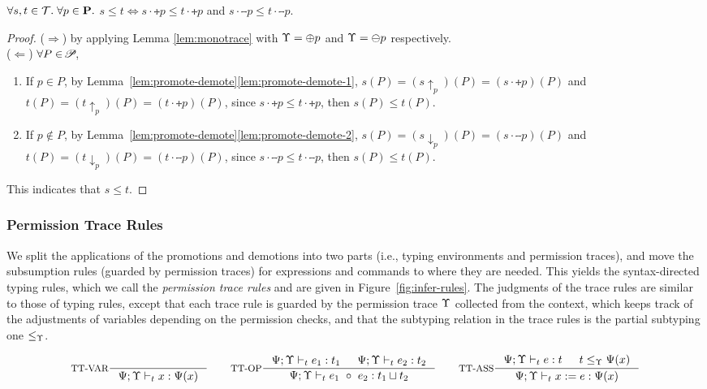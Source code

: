 {{{\begin{lemma}\label{lem:tracesub}
$\forall s,t\in\mathcal{T}.\; \forall p\in\mathbf{P}.$ $s\leq t\Leftrightarrow  s\cdot\tplus{ p}\leq t\cdot\tplus{ p}$ and $s\cdot\tminus{ p}\leq t\cdot\tminus{ p}$.
\end{lemma}
\begin{proof}
($\Rightarrow$) by applying Lemma \ref{lem:monotrace} with $\Upsilon=\oplus  p$ and $\Upsilon=\ominus p$ respectively.\\
($\Leftarrow$) $\forall P\in\!\mathscr{P}\!$,
\begin{enumerate}[label=(\arabic*)]
	\item If $p\in P$, by Lemma~\ref{lem:promote-demote}\ref{lem:promote-demote-1}, $s(P)=(s\uparrow_{p})(P)=(s\cdot\tplus{ p})(P)$ and $t(P)=(t\uparrow_{p})(P)=(t\cdot\tplus{ p})(P)$, since $s\cdot\tplus{ p}\leq t\cdot\tplus{ p}$, then $s(P)\leq t(P)$.
	\item If $p\not\in P$, by Lemma~\ref{lem:promote-demote}\ref{lem:promote-demote-2}, $s(P)=(s\downarrow_{p})(P)=(s\cdot\tminus{ p})(P)$ and $t(P)=(t\downarrow_{p})(P)=(t\cdot\tminus{ p})(P)$, since $s\cdot\tminus{ p}\leq t\cdot\tminus{p}$, then $s(P)\leq t(P)$.
\end{enumerate}
This indicates that $s\leq t$.
\end{proof}


\subsubsection{\textbf{Permission Trace Rules}}
 We split the applications of the promotions and demotions into two parts  (i.e., typing environments and permission traces), and move the subsumption rules (guarded by permission traces) for expressions and commands to where they are needed.
This yields the syntax-directed  typing rules, which we call the {\em permission trace rules} and are given in Figure~\ref{fig:infer-rules}.
The judgments of the trace rules are similar to those of typing rules, except that each trace rule is guarded by the permission trace $\Upsilon$ collected from the context, which keeps track of the adjustments of variables depending on the permission checks,
and that the subtyping relation in the trace rules is the partial subtyping one $\leq_{\Upsilon}$.

\begin{figure*}[ht]
\begin{tiny}
\[
\inference[TT-VAR]{}
{\Psi;\trace\vdash_{t} \leVAR{x} : \Psi(x)}
\qquad
\inference[TT-OP]
{\Psi;\trace\vdash_{t} e_1: t_1 & \Psi;\trace \vdash_{t} e_2: t_2}
{\Psi;\trace \vdash_{t} \leOP{e_1}{e_2} : t_1\sqcup t_2}
\qquad
\inference[TT-ASS]
{\Psi;\trace \vdash_{t} e : t & t \leq_{\trace} \Psi(x)}
{\Psi;\trace \vdash_{t} \lcASS{x}{e} : \Psi(x)}
\]



\end{tiny}
\end{figure*}}}}
